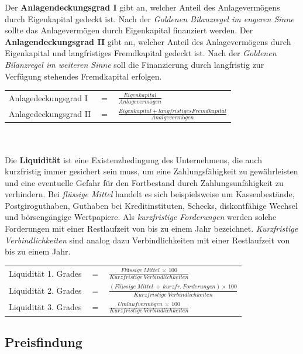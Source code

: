 Der {\bf Anlagendeckungsgrad I} gibt an, welcher Anteil des Anlagevermögens durch Eigenkapital gedeckt ist. Nach der {\it Goldenen Bilanzregel im engeren Sinne} sollte das Anlagevermögen durch Eigenkapital finanziert werden. Der {\bf Anlagendeckungsgrad II} gibt an, welcher Anteil des Anlagevermögens durch Eigenkapital und langfristiges Fremdkapital gedeckt ist. Nach der {\it Goldenen Bilanzregel im weiteren Sinne} soll die Finanzierung durch langfristig zur Verfügung stehendes Fremdkapital erfolgen.\\

\begin{tabular}{lll}
Anlagedeckungsgrad I & $=$ & $\frac{Eigenkapital}{Anlagevermögen}$\\
Anlagedeckungsgrad II & $=$ & $\frac{Eigenkapital + langfristiges Fremdkapital}{Analgevermögen}$\\
\end{tabular}\\\\

Die {\bf Liquidität} ist eine Existenzbedingung des Unternehmens, die auch kurzfristig immer gesichert sein muss, um eine Zahlungsfähigkeit zu gewährleisten und eine eventuelle Gefahr für den Fortbestand durch Zahlungsunfähigkeit zu verhindern. Bei {\it flüssige Mittel} handelt es sich beispielsweise um Kassenbestände, Postgiroguthaben, Guthaben bei Kreditinstituten, Schecks, diskontfähige Wechsel und börsengängige Wertpapiere. 
Als {\it kurzfristige Forderungen} werden solche Forderungen mit einer Restlaufzeit von bis zu einem Jahr bezeichnet. {\it Kurzfristige Verbindlichkeiten} sind analog dazu Verbindlichkeiten mit einer Restlaufzeit von bis zu einem Jahr.\\

\begin{tabular}{lll}
Liquidität 1. Grades & $=$ & $\frac{Flüssige\ Mittel\ \times\ 100}{Kurzfristige\ Verbindlichkeiten}$\\
Liquidität 2. Grades & $=$ & $\frac{(Flüssige\ Mittel\ +\ kurzfr.\ Forderungen) \times\ 100}{Kurzfristige\ Verbindlichkeiten}$\\
Liquidität 3. Grades & $=$ & $\frac{Umlaufvermögen\ \times\ 100}{Kurzfristige\ Verbindlichkeiten}$
\end{tabular}


\subsection{Preisfindung}


